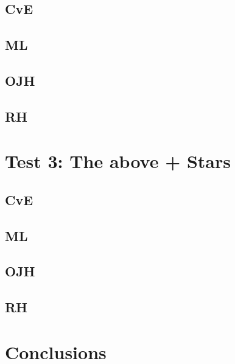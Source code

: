 \documentclass[10pt, a4paper]{article}
\begin{document}
\subsection{CvE}
\subsection{ML}
\subsection{OJH}
\subsection{RH}

\section{Test 3: The above + Stars}
\subsection{CvE}
\subsection{ML}
\subsection{OJH}
\subsection{RH}


\section{Conclusions}
\end{document}
